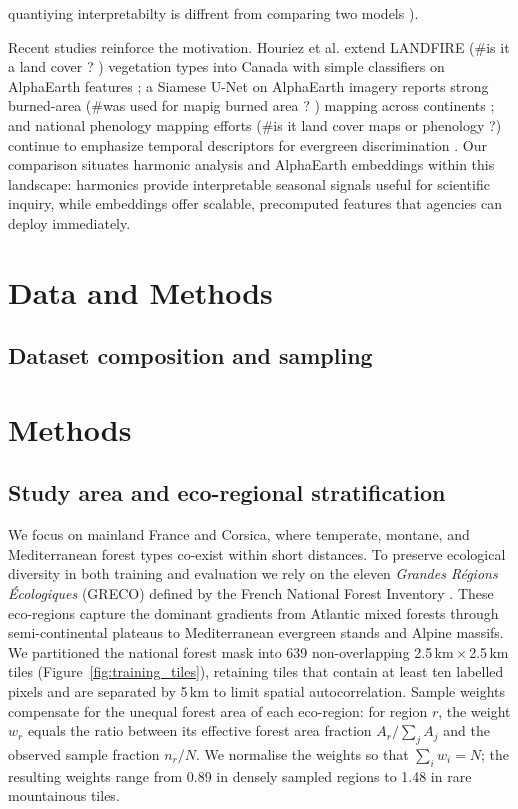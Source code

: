 \documentclass[utf8]{FrontiersinHarvard}
\begin{document}
quantiying interpretabilty is diffrent from comparing two models ).

Recent studies reinforce the motivation. Houriez et al. extend LANDFIRE (#is it a land cover ? ) vegetation types into Canada with simple classifiers on AlphaEarth features \citep{Houriez2025AEFDataGen}; a Siamese U-Net on AlphaEarth imagery reports strong burned-area (#was used for mapig burned area ? ) mapping across continents \citep{Seydi2025AlphaEarthBurnedArea}; and national phenology mapping efforts (#is it land cover maps or phenology ?) continue to emphasize temporal descriptors for evergreen discrimination \citep{Inglada2017,Li2023,Low2020,Bolton2020}. Our comparison situates harmonic analysis and AlphaEarth embeddings within this landscape: harmonics provide interpretable seasonal signals useful for scientific inquiry, while embeddings offer scalable, precomputed features that agencies can deploy immediately.

\section{Data and Methods}

\subsection{Dataset composition and sampling}
\section{Methods}

\subsection{Study area and eco-regional stratification}
\label{sec:greco}
We focus on mainland France and Corsica, where temperate, montane, and Mediterranean forest types co-exist within short distances. To preserve ecological diversity in both training and evaluation we rely on the eleven \emph{Grandes Régions Écologiques} (GRECO) defined by the French National Forest Inventory \citep{IGN2013GRECO}. These eco-regions capture the dominant gradients from Atlantic mixed forests through semi-continental plateaus to Mediterranean evergreen stands and Alpine massifs. We partitioned the national forest mask into 639 non-overlapping 2.5\,km\,$\times$\,2.5\,km tiles (Figure~\ref{fig:training_tiles}), retaining tiles that contain at least ten labelled pixels and are separated by 5\,km to limit spatial autocorrelation. Sample weights compensate for the unequal forest area of each eco-region: for region \(r\), the weight \(w_r\) equals the ratio between its effective forest area fraction \(A_r/\sum_{j} A_j\) and the observed sample fraction \(n_r/N\). We normalise the weights so that \(\sum_i w_i = N\); the resulting weights range from 0.89 in densely sampled regions to 1.48 in rare mountainous tiles.
\end{document}
